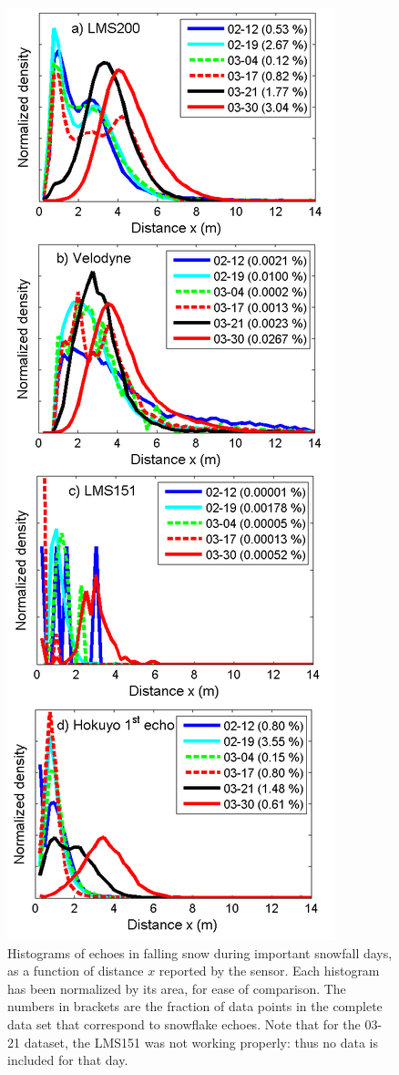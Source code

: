 \begin{figure}[th]
    \centering
    \includegraphics[width=0.80\linewidth]{./img/Histograms.png}
    \caption{Histograms of echoes in falling snow during important snowfall days, as a function of distance $x$ reported by the sensor. Each histogram has been normalized by its area, for ease of comparison. The numbers in brackets are the fraction of data points in the complete data set that correspond to snowflake echoes. Note that for the 03-21 dataset, the LMS151 was not working properly: thus no data is included for that day.}
    \label{fig:Histograms}
\end{figure}

